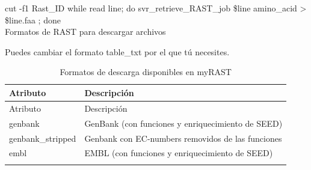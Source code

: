 \documentclass[12pt,twoside]{reedthesis}
\begin{document}
{  cut -f1 Rast\_ID \textbar{} while read line; do svr\_retrieve\_RAST\_job
  \$line amino\_acid \textgreater{} \$line.faa ; done\\
  Formatos de RAST para descargar archivos
  
  Puedes cambiar el formato table\_txt por el que tú necesites.
  
  \begin{longtable}[]{@{}ll@{}}
  \caption{Formatos de descarga disponibles en myRAST
  \label{tab:myrast}}\tabularnewline
  \toprule
  \begin{minipage}[b]{0.22\columnwidth}\raggedright\strut
  Atributo\strut
  \end{minipage} & \begin{minipage}[b]{0.72\columnwidth}\raggedright\strut
  Descripción\strut
  \end{minipage}\tabularnewline
  \midrule
  \endfirsthead
  \toprule
  \begin{minipage}[b]{0.22\columnwidth}\raggedright\strut
  Atributo\strut
  \end{minipage} & \begin{minipage}[b]{0.72\columnwidth}\raggedright\strut
  Descripción\strut
  \end{minipage}\tabularnewline
  \midrule
  \endhead
  \begin{minipage}[t]{0.22\columnwidth}\raggedright\strut
  genbank\strut
  \end{minipage} & \begin{minipage}[t]{0.72\columnwidth}\raggedright\strut
  GenBank (con funciones y enriquecimiento de SEED)\strut
  \end{minipage}\tabularnewline
  \begin{minipage}[t]{0.22\columnwidth}\raggedright\strut
  genbank\_stripped\strut
  \end{minipage} & \begin{minipage}[t]{0.72\columnwidth}\raggedright\strut
  Genbank con EC-numbers removidos de las funciones\strut
  \end{minipage}\tabularnewline
  \begin{minipage}[t]{0.22\columnwidth}\raggedright\strut
  embl\strut
  \end{minipage} & \begin{minipage}[t]{0.72\columnwidth}\raggedright\strut
  EMBL (con funciones y enriquecimiento de SEED)\strut
  \end{minipage}\tabularnewline
  \begin{minipage}[t]{0.22\columnwidth}\raggedright\strut

\end{minipage}
\end{longtable}}
\end{document}

